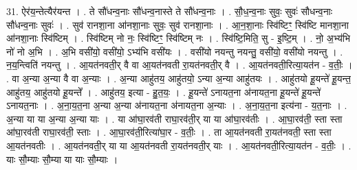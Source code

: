 \documentclass[17pt]{extarticle}
\begin{document}
31. ऐर॑य॒न्तेत्यैर॑यन्त । . ते सौ॑धन्व॒नाः सौ॑धन्व॒नास्ते ते सौ॑धन्व॒नाः । . सौ॒ध॒न्व॒नाः सुवः॒ सुवः॑ सौधन्व॒नाः सौ॑धन्व॒नाः सुवः॑ । . सुव॑ रानशा॒ना आ॑नशा॒नाः सुवः॒ सुव॑ रानशा॒नाः । . आ॒न॒शा॒नाः स्वि॑ष्टिꣳ॒॒ स्वि॑ष्टि मानशा॒ना आ॑नशा॒नाः स्वि॑ष्टिम् । . स्वि॑ष्टिम् नो नः॒ स्वि॑ष्टिꣳ॒॒ स्वि॑ष्टिम् नः । . स्वि॑ष्टि॒मिति॒ सु - इ॒ष्टि॒म् । . नो॒ अ॒भ्य॑भि नो॑ नो अ॒भि । . अ॒भि वसी॑यो॒ वसी॑यो॒ ऽभ्य॑भि वसी॑यः । . वसी॑यो नयन्तु नयन्तु॒ वसी॑यो॒ वसी॑यो नयन्तु । . न॒य॒न्त्विति॑ नयन्तु । . आ॒यत॑नवती॒र् वै वा आ॒यत॑नवती रा॒यत॑नवती॒र् वै । . आ॒यत॑नवती॒रित्या॒यत॑न - व॒तीः॒ । . वा अ॒न्या अ॒न्या वै वा अ॒न्याः । . अ॒न्या आहु॑तय॒ आहु॑तयो॒ ऽन्या अ॒न्या आहु॑तयः । . आहु॑तयो हू॒यन्ते॑ हू॒यन्त॒ आहु॑तय॒ आहु॑तयो हू॒यन्ते᳚ । . आहु॑तय॒ इत्या - हु॒त॒यः॒ । . हू॒यन्ते॑ ऽनायत॒ना अ॑नायत॒ना हू॒यन्ते॑ हू॒यन्ते॑ ऽनायत॒नाः । . अ॒ना॒य॒त॒ना अ॒न्या अ॒न्या अ॑नायत॒ना अ॑नायत॒ना अ॒न्याः । . अ॒ना॒य॒त॒ना इत्य॑ना - य॒त॒नाः । . अ॒न्या या या अ॒न्या अ॒न्या याः । . या आ॑घा॒रव॑ती राघा॒रव॑ती॒र् या या आ॑घा॒रव॑तीः । . आ॒घा॒रव॑ती॒ स्ता स्ता आ॑घा॒रव॑ती राघा॒रव॑ती॒ स्ताः । . आ॒घा॒रव॑ती॒रित्या॑घा॒र - व॒तीः॒ । . ता आ॒यत॑नवती रा॒यत॑नवती॒ स्ता स्ता आ॒यत॑नवतीः । . आ॒यत॑नवती॒र् या या आ॒यत॑नवती रा॒यत॑नवती॒र् याः । . आ॒यत॑नवती॒रित्या॒यत॑न - व॒तीः॒ । . याः सौ॒म्याः सौ॒म्या या याः सौ॒म्याः । \newline
\pagebreak
{}
\end{document}
